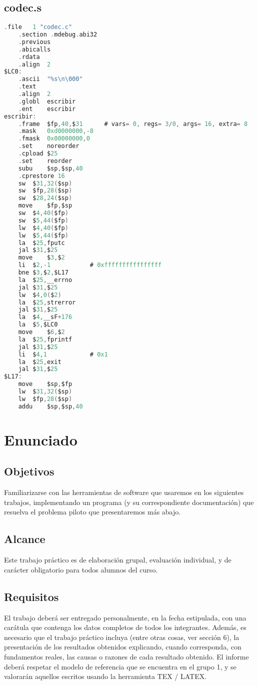 \documentclass[a4paper,11pt, margin=1in]{article}
\begin{document}
\subsection{codec.s}
\begin{lstlisting}[language=c,breaklines=true]
	.file	1 "codec.c"
	.section .mdebug.abi32
	.previous
	.abicalls
	.rdata
	.align	2
$LC0:
	.ascii	"%s\n\000"
	.text
	.align	2
	.globl	escribir
	.ent	escribir
escribir:
	.frame	$fp,40,$31		# vars= 0, regs= 3/0, args= 16, extra= 8
	.mask	0xd0000000,-8
	.fmask	0x00000000,0
	.set	noreorder
	.cpload	$25
	.set	reorder
	subu	$sp,$sp,40
	.cprestore 16
	sw	$31,32($sp)
	sw	$fp,28($sp)
	sw	$28,24($sp)
	move	$fp,$sp
	sw	$4,40($fp)
	sw	$5,44($fp)
	lw	$4,40($fp)
	lw	$5,44($fp)
	la	$25,fputc
	jal	$31,$25
	move	$3,$2
	li	$2,-1			# 0xffffffffffffffff
	bne	$3,$2,$L17
	la	$25,__errno
	jal	$31,$25
	lw	$4,0($2)
	la	$25,strerror
	jal	$31,$25
	la	$4,__sF+176
	la	$5,$LC0
	move	$6,$2
	la	$25,fprintf
	jal	$31,$25
	li	$4,1			# 0x1
	la	$25,exit
	jal	$31,$25
$L17:
	move	$sp,$fp
	lw	$31,32($sp)
	lw	$fp,28($sp)
	addu	$sp,$sp,40
\end{lstlisting}

\section{Enunciado}


\subsection{Objetivos}
Familiarizarse con las herramientas de software que usaremos en los siguientes trabajos, implementando un programa (y su correspondiente documentación) que resuelva el problema piloto que presentaremos más abajo.

\subsection{Alcance}
Este trabajo práctico es de elaboración grupal, evaluación individual, y de
carácter obligatorio para todos alumnos del curso.

\subsection{Requisitos}
El trabajo deberá ser entregado personalmente, en la fecha estipulada, con
una carátula que contenga los datos completos de todos los integrantes.
Además, es necesario que el trabajo práctico incluya (entre otras cosas, ver
sección 6), la presentación de los resultados obtenidos explicando, cuando corresponda, con fundamentos reales, las causas o razones de cada resultado obtenido.
El informe deberá respetar el modelo de referencia que se encuentra en el
grupo 1, y se valorarán aquellos escritos usando la herramienta TEX / LATEX.
\end{document}
